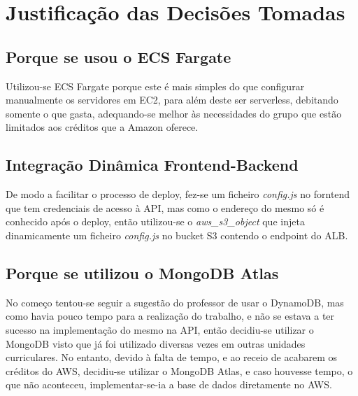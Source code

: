 \section{Justificação das Decisões Tomadas}

\subsection{Porque se usou o ECS Fargate}
Utilizou-se ECS Fargate porque este é mais simples do que configurar manualmente os servidores em EC2, para além deste ser serverless, debitando somente o que gasta, adequando-se melhor às necessidades do grupo que estão limitados aos créditos que a Amazon oferece.

\subsection{Integração Dinâmica Frontend-Backend}
De modo a facilitar o processo de deploy, fez-se um ficheiro \textit{config.js} no forntend que tem credenciais de acesso à API, mas como o endereço do mesmo só é conhecido após o deploy, então utilizou-se o \textit{aws\_s3\_object} que injeta dinamicamente um ficheiro \textit{config.js} no bucket S3 contendo o endpoint do ALB.

\subsection{Porque se utilizou o MongoDB Atlas}
No começo tentou-se seguir a sugestão do professor de usar o DynamoDB, mas como havia pouco tempo para a realização do trabalho, e não se estava a ter sucesso na implementação do mesmo na API, então decidiu-se utilizar o MongoDB visto que já foi utilizado diversas vezes em outras unidades curriculares.
No entanto, devido à falta de tempo, e ao receio de acabarem os créditos do AWS, decidiu-se utilizar o MongoDB Atlas, e caso houvesse tempo, o que não aconteceu, implementar-se-ia a base de dados diretamente no AWS.